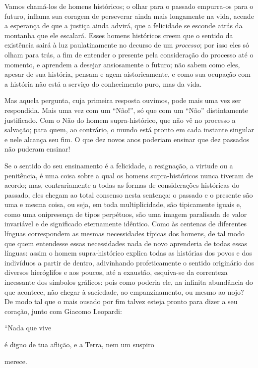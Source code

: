 Vamos chamá-los de homens históricos; o olhar para o passado empurra-os
para o futuro, inflama sua coragem de perseverar ainda mais longamente
na vida, acende a esperança de que a justiça ainda advirá, que a
felicidade se esconde atrás da montanha que ele escalará. Esses homens
históricos creem que o sentido da existência sairá à luz paulatinamente
no decurso de um \emph{processo}; por isso eles só olham para trás, a
fim de entender o presente pela consideração do processo até o momento,
e aprendem a desejar ansiosamente o futuro; não sabem como eles, apesar
de sua história, pensam e agem aistoricamente, e como sua ocupação com a
história não está a serviço do conhecimento puro, mas da vida.

Mas aquela pergunta, cuja primeira resposta ouvimos, pode mais uma vez
ser respondida. Mais uma vez com um ``Não!'', só que com um ``Não''
distintamente justificado. Com o Não do homem supra-histórico, que não
vê no processo a salvação; para quem, ao contrário, o mundo está pronto
em cada instante singular e nele alcança seu fim. O que dez novos anos
poderiam ensinar que dez passados não puderam ensinar!

Se o sentido do seu ensinamento é a felicidade, a resignação, a virtude
ou a penitência, é uma coisa sobre a qual os homens supra-históricos
nunca tiveram de acordo; mas, contrariamente a todas as formas de
considerações históricas do passado, eles chegam ao total consenso nesta
sentença: o passado e o presente são uma e mesma coisa, ou seja, em toda
multiplicidade, são tipicamente iguais e, como uma onipresença de tipos
perpétuos, são uma imagem paralisada de valor invariável e de
significado eternamente idêntico. Como às centenas de diferentes línguas
correspondem as mesmas necessidades típicas dos homens, de tal modo que
quem entendesse essas necessidades nada de novo aprenderia de todas
essas línguas: assim o homem supra-histórico explica todas as histórias
dos povos e dos indivíduos a partir de dentro, adivinhando
profeticamente o sentido originário dos diversos hieróglifos e aos
poucos, até a exaustão, esquiva-se da correnteza incessante dos símbolos
gráficos: pois como poderia ele, na infinita abundância do que acontece,
não chegar à saciedade, ao empanzinamento, ou mesmo ao nojo? De modo tal
que o mais ousado por fim talvez esteja pronto para dizer a seu coração,
junto com Giacomo Leopardi:

``Nada que vive

é digno de tua aflição, e a Terra, nem um suspiro

merece.

